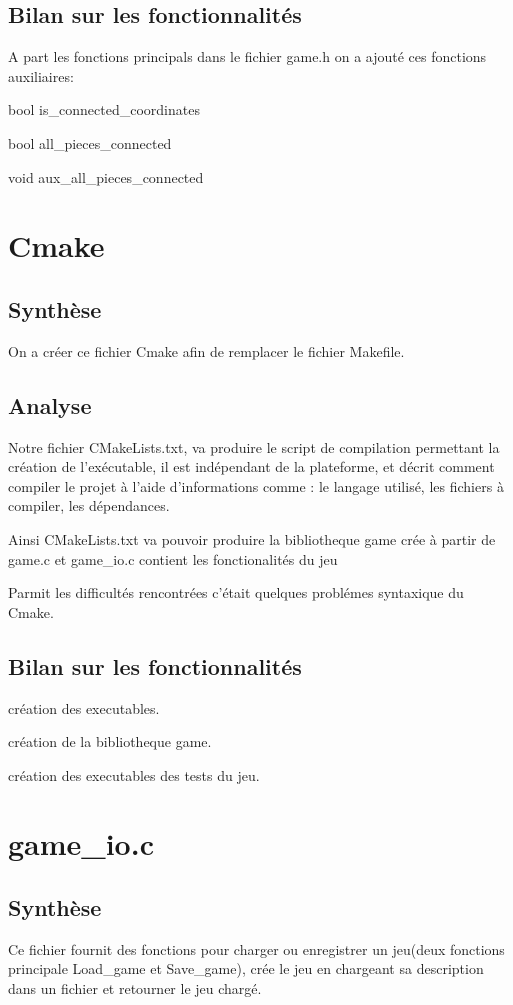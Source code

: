 \documentclass[12pt]{article}
\begin{document}
\subsection{Bilan sur les fonctionnalités}
A part les fonctions principals dans le fichier game.h on a ajouté ces fonctions auxiliaires:

bool is\_connected\_coordinates

bool all\_pieces\_connected

void aux\_all\_pieces\_connected



\section{Cmake}
\subsection{Synthèse}
On a créer ce fichier Cmake afin de remplacer le fichier Makefile.
\subsection{Analyse}
Notre fichier CMakeLists.txt, va produire le script de compilation permettant la création de l'exécutable,
il est indépendant de la plateforme, et décrit comment compiler le projet à l'aide d'informations comme : le langage utilisé, les fichiers à compiler, les dépendances.

Ainsi CMakeLists.txt va pouvoir produire la bibliotheque game crée à partir de game.c et game\_io.c contient les fonctionalités du jeu

Parmit les difficultés rencontrées c'était quelques problémes syntaxique du Cmake.
\subsection{Bilan sur les fonctionnalités}
création des executables.
 
création de la bibliotheque game.
 
création des executables des tests du jeu.



\section{game\_io.c}
\subsection{Synthèse}
Ce fichier fournit des fonctions pour charger ou enregistrer un jeu(deux fonctions principale Load\_game et Save\_game), crée le jeu en chargeant sa description dans un fichier et retourner le jeu chargé.
\end{document}
